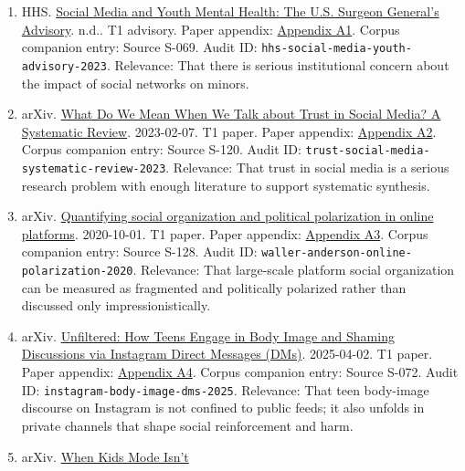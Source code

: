 \documentclass[
  american,
  11pt,
  letterpaper,
]{article}
\providecommand{\tightlist}{%
  \setlength{\itemsep}{0pt}\setlength{\parskip}{0pt}}
\begin{document}
\begin{enumerate}
\def\labelenumi{\arabic{enumi}.}
\tightlist
\item
  HHS.
  \href{https://www.hhs.gov/surgeongeneral/priorities/youth-mental-health/social-media/index.html}{Social
  Media and Youth Mental Health: The U.S. Surgeon General's Advisory}.
  n.d.. T1 advisory. Paper appendix:
  \hyperref[appendix-a1-social-media-and-youth-mental-health-the-u-s-surgeon-general-s-advisory]{Appendix
  A1}. Corpus companion entry: Source S-069. Audit ID:
  \texttt{hhs-social-media-youth-advisory-2023}. Relevance: That there
  is serious institutional concern about the impact of social networks
  on minors.
\item
  arXiv. \href{https://arxiv.org/abs/2302.03671}{What Do We Mean When We
  Talk about Trust in Social Media? A Systematic Review}. 2023-02-07. T1
  paper. Paper appendix:
  \hyperref[appendix-a2-what-do-we-mean-when-we-talk-about-trust-in-social-media-a-systematic-review]{Appendix
  A2}. Corpus companion entry: Source S-120. Audit ID:
  \texttt{trust-social-media-systematic-review-2023}. Relevance: That
  trust in social media is a serious research problem with enough
  literature to support systematic synthesis.
\item
  arXiv. \href{https://arxiv.org/abs/2010.00590}{Quantifying social
  organization and political polarization in online platforms}.
  2020-10-01. T1 paper. Paper appendix:
  \hyperref[appendix-a3-quantifying-social-organization-and-political-polarization-in-online-platforms]{Appendix
  A3}. Corpus companion entry: Source S-128. Audit ID:
  \texttt{waller-anderson-online-polarization-2020}. Relevance: That
  large-scale platform social organization can be measured as fragmented
  and politically polarized rather than discussed only
  impressionistically.
\item
  arXiv. \href{https://arxiv.org/abs/2504.02176}{Unfiltered: How Teens
  Engage in Body Image and Shaming Discussions via Instagram Direct
  Messages (DMs)}. 2025-04-02. T1 paper. Paper appendix:
  \hyperref[appendix-a4-unfiltered-how-teens-engage-in-body-image-and-shaming-discussions-via-instagram-direct-messages-dms]{Appendix
  A4}. Corpus companion entry: Source S-072. Audit ID:
  \texttt{instagram-body-image-dms-2025}. Relevance: That teen
  body-image discourse on Instagram is not confined to public feeds; it
  also unfolds in private channels that shape social reinforcement and
  harm.
\item
  arXiv. \href{https://arxiv.org/abs/2507.00299}{When Kids Mode Isn't
}
\end{enumerate}
\end{document}
